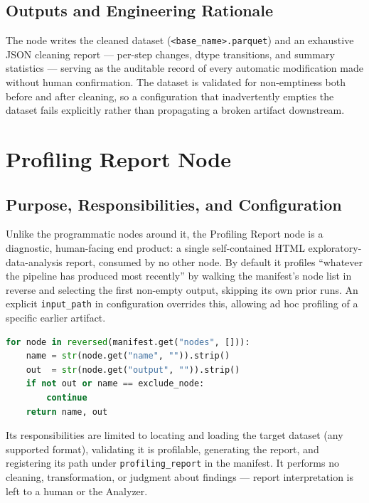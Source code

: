 \subsection{Outputs and Engineering Rationale}
\label{subsec:cleaning-outputs}

The node writes the cleaned dataset (\texttt{<base\_name>.parquet}) and an exhaustive JSON cleaning report --- per-step changes, dtype transitions, and summary statistics --- serving as the auditable record of every automatic modification made without human confirmation. The dataset is validated for non-emptiness both before and after cleaning, so a configuration that inadvertently empties the dataset fails explicitly rather than propagating a broken artifact downstream.

\section{Profiling Report Node}
\label{sec:impl-profiling}

\subsection{Purpose, Responsibilities, and Configuration}
\label{subsec:profiling-overview}

Unlike the programmatic nodes around it, the Profiling Report node is a diagnostic, human-facing end product: a single self-contained HTML exploratory-data-analysis report, consumed by no other node. By default it profiles ``whatever the pipeline has produced most recently'' by walking the manifest's node list in reverse and selecting the first non-empty output, skipping its own prior runs. An explicit \texttt{input\_path} in configuration overrides this, allowing ad hoc profiling of a specific earlier artifact.

\begin{lstlisting}[language=Python, caption={Reverse manifest walk locating the most recent upstream output.}, label={lst:profiling-last-node}]
for node in reversed(manifest.get("nodes", [])):
    name = str(node.get("name", "")).strip()
    out  = str(node.get("output", "")).strip()
    if not out or name == exclude_node:
        continue
    return name, out
\end{lstlisting}

Its responsibilities are limited to locating and loading the target dataset (any supported format), validating it is profilable, generating the report, and registering its path under \texttt{profiling\_report} in the manifest. It performs no cleaning, transformation, or judgment about findings --- report interpretation is left to a human or the Analyzer.

